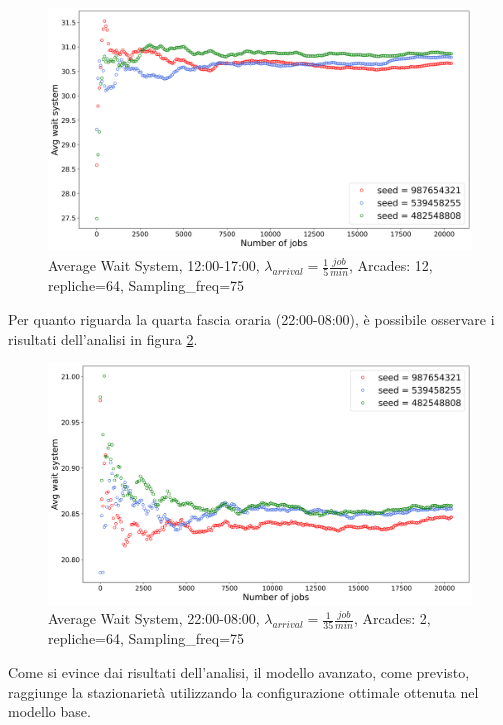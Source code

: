 \documentclass{article}
\begin{document}
\begin{figure}[H]
\centering
\captionsetup{justification=centering,margin=2cm}
\includegraphics[scale=0.48]{images/adv_avg_ws_aft_s.png}
\caption{Average Wait System, 12:00-17:00, $\lambda_{arrival}=\frac{1}{5} \frac{job}{min}$, Arcades: 12, repliche=64, Sampling\_freq=75}\label{figura:adv_avg_ws_aft_s}
\end{figure}


Per quanto riguarda la quarta fascia oraria (22:00-08:00), è possibile osservare i risultati dell'analisi in figura \ref{figura:adv_avg_ws_night_s}.


\begin{figure}[H]
\centering
\captionsetup{justification=centering,margin=2cm}
\includegraphics[scale=0.48]{images/adv_avg_ws_night_s.png}
\caption{Average Wait System, 22:00-08:00, $\lambda_{arrival}=\frac{1}{35} \frac{job}{min}$, Arcades: 2, repliche=64, Sampling\_freq=75}\label{figura:adv_avg_ws_night_s}
\end{figure}

Come si evince dai risultati dell'analisi, il modello avanzato, come previsto, raggiunge la stazionarietà utilizzando la configurazione ottimale ottenuta nel modello base.
\end{document}
